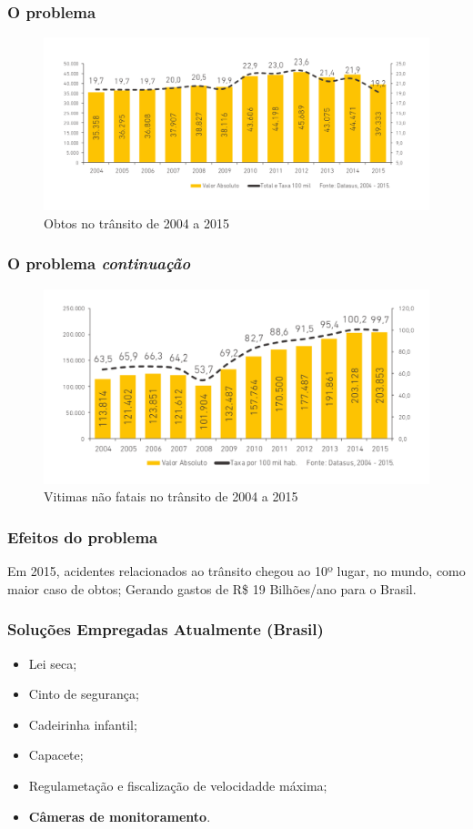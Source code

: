 \begin{frame}
	\frametitle{O problema}
\begin{figure}[h]
	\caption{Obtos no trânsito de 2004 a 2015}
	\centering
	\includegraphics[width=1\textwidth]{imagens/obto}
	\end{figure}
\end{frame}

\begin{frame}
	\frametitle{O problema \textit{continuação}}
\begin{figure}[h]
	\caption{Vitimas não fatais no trânsito de 2004 a 2015}
	\centering
	\includegraphics[width=1\textwidth]{imagens/ferido}
	\end{figure}
\end{frame}

\begin{frame}
	\frametitle{Efeitos do problema}
	Em 2015, acidentes relacionados ao trânsito chegou ao 
	10º lugar, no mundo, como maior caso de obtos;
	Gerando gastos de R\$ 19 Bilhões/ano para o Brasil\cite{ambev}.
\end{frame}

\begin{frame}
	\frametitle{Soluções Empregadas Atualmente (Brasil)}
	\begin{itemize}[<+->]
		\item Lei seca;
		\item Cinto de segurança;
		\item Cadeirinha infantil;
		\item Capacete;
		\item Regulametação e fiscalização de velocidadde máxima;
		\item \textbf{Câmeras de monitoramento}.
 	\end{itemize}
\end{frame}